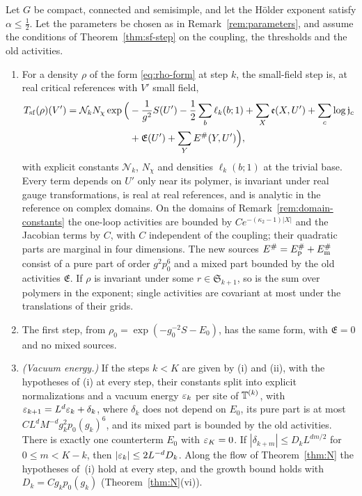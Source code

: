 \begin{maintheorem}\label{thm:L}
Let $G$ be compact, connected and semisimple, and let the H\"older exponent satisfy $\alpha\le\frac12$. Let the parameters be chosen as in Remark~\ref{rem:parameters}, and assume the conditions of Theorem~\ref{thm:sf-step} on the coupling, the thresholds and the old activities.
\begin{enumerate}[label=(\roman*)]
\item For a density $\rho$ of the form \eqref{eq:rho-form} at step $k$, the small-field step is, at real critical references with $V'$ small field,
\[
\begin{aligned}
T_{\rm sf}(\rho)(V')=\mathcal N_kN_\chi\exp\Big(&-\frac1{g^2}S(U')-\frac12\sum_b\ell_k(b;1)+\sum_X\mathfrak e(X,U')+\sum_c\log\mathfrak j_c\\
&+\mathfrak E(U')+\sum_YE^\#(Y,U')\Big),
\end{aligned}
\]
with explicit constants $\mathcal N_k$, $N_\chi$ and densities $\ell_k(b;1)$ at the trivial base. Every term depends on $U'$ only near its polymer, is invariant under real gauge transformations, is real at real references, and is analytic in the reference on complex domains. On the domains of Remark~\ref{rem:domain-constants} the one-loop activities are bounded by $Ce^{-(\kappa_2-1)|X|}$ and the Jacobian terms by $C$, with $C$ independent of the coupling; their quadratic parts are marginal in four dimensions. The new sources $E^\#=E^\#_{\rm p}+E^\#_{\rm m}$ consist of a pure part of order $g^2p_0^6$ and a mixed part bounded by the old activities $\mathfrak E$. If $\rho$ is invariant under some $r\in\mathfrak S_{k+1}$, so is the sum over polymers in the exponent; single activities are covariant at most under the translations of their grids.
\item The first step, from $\rho_0=\exp(-g_0^{-2}S-E_0)$, has the same form, with $\mathfrak E=0$ and no mixed sources.
\item \emph{(Vacuum energy.)} If the steps $k<K$ are given by (i) and (ii), with the hypotheses of (i) at every step, their constants split into explicit normalizations and a vacuum energy $\varepsilon_k$ per site of $\mathbb T^{(k)}$, with $\varepsilon_{k+1}=L^d\varepsilon_k+\delta_k$, where $\delta_k$ does not depend on $E_0$, its pure part is at most $CL^dM^{-d}g_k^2p_0(g_k)^6$, and its mixed part is bounded by the old activities. There is exactly one counterterm $E_0$ with $\varepsilon_K=0$. If $|\delta_{k+m}|\le D_kL^{dm/2}$ for $0\le m<K-k$, then $|\varepsilon_k|\le2L^{-d}D_k$. Along the flow of Theorem~\ref{thm:N} the hypotheses of~(i) hold at every step, and the growth bound holds with $D_k=Cg_kp_0(g_k)$ (Theorem~\ref{thm:N}(vi)).
\end{enumerate}
\end{maintheorem}


